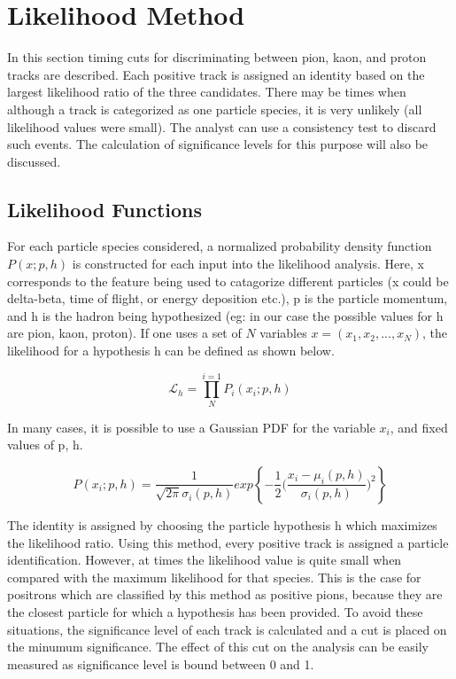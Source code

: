 \section{Likelihood Method}

In this section timing cuts for discriminating between pion, kaon, and proton tracks are described.  Each positive track is assigned an identity based on the largest likelihood ratio of the three candidates.  There may be times when although a track is categorized as one particle species, it is very unlikely (all likelihood values were small). The analyst can use a consistency test to discard such events.  The calculation of significance levels for this purpose will also be discussed.  \\

\subsection{Likelihood Functions}

For each particle species considered, a normalized probability density function $P(x;p,h)$ is constructed for each input into the likelihood analysis.  Here, x corresponds to the feature being used to catagorize different particles (x could be delta-beta, time of flight, or energy deposition etc.), p is the particle momentum, and h is the hadron being hypothesized (eg: in our case the possible values for h are pion, kaon, proton).  If one uses a set of $N$ variables $x = (x_1, x_2, ..., x_N)$, the likelihood for a hypothesis h can be defined as shown below. 

\begin{equation}
  \mathcal{L}_h = \prod_{N}^{i=1} P_{i} (x_i; p, h)
\end{equation}

In many cases, it is possible to use a Gaussian PDF for the variable $x_i$, and fixed values of p, h.

\begin{equation}
  P(x_i;p,h) = \frac{1}{\sqrt{2 \pi} \sigma_i(p,h) } exp \left \{ -\frac{1}{2} \bigg( \frac{x_i - \mu_i(p,h)}{\sigma_i(p,h)} \bigg)^2 \right \}
\end{equation}

The identity is assigned by choosing the particle hypothesis h which maximizes the likelihood ratio.  Using this method, every positive track is assigned a particle identification.  However, at times the likelihood value is quite small when compared with the maximum likelihood for that species.  This is the case for positrons which are classified by this method as positive pions, because they are the closest particle for which a hypothesis has been provided.  To avoid these situations, the significance level of each track is calculated and a cut is placed on the minumum significance.  The effect of this cut on the analysis can be easily measured as significance level is bound between 0 and 1.  

